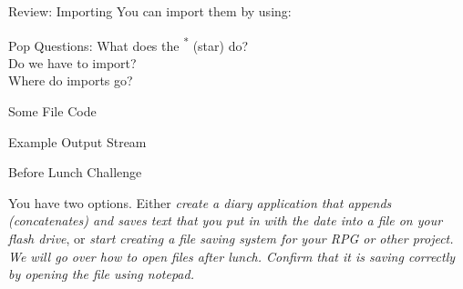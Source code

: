 \begin{frame}{Review: Importing}
You can import them by using:\\

 \pause

\begin{center}
Pop Questions: What does the \textsuperscript{*} (star) do? \pause\\
Do we have to import? \\\pause
Where do imports go?
\end{center}
\end{frame}


\begin{frame}[fragile]{Some File Code}
\begin{semiverbatim}\end{semiverbatim}		
\end{frame}


\begin{frame}[fragile]{Example Output Stream}
\begin{semiverbatim}\end{semiverbatim}		
\end{frame}

\begin{frame}{Before Lunch Challenge}
\begin{center}
You have two options. Either \emph{create a diary application that appends (concatenates) and saves text that you put in with the date into a file on your flash drive}, or \emph{start creating a file saving system for your RPG or other project. We will go over how to open files after lunch. Confirm that it is saving correctly by opening the file using notepad.}
\end{center}

\end{frame}

